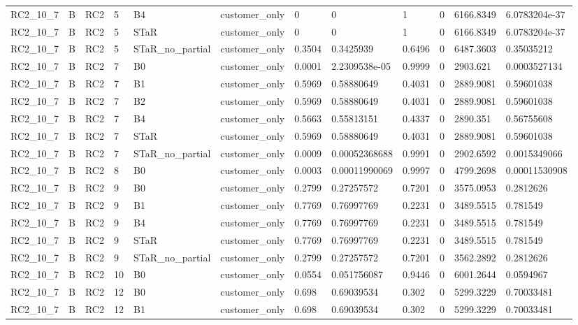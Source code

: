 \begin{longtable}{llllllllllll}
RC2\_10\_7 & B & RC2 & 5 & B4 & customer\_only & 0 & 0 & 1 & 0 & 6166.8349 & 6.0783204e-37 \\
RC2\_10\_7 & B & RC2 & 5 & STaR & customer\_only & 0 & 0 & 1 & 0 & 6166.8349 & 6.0783204e-37 \\
RC2\_10\_7 & B & RC2 & 5 & STaR\_no\_partial & customer\_only & 0.3504 & 0.3425939 & 0.6496 & 0 & 6487.3603 & 0.35035212 \\
RC2\_10\_7 & B & RC2 & 7 & B0 & customer\_only & 0.0001 & 2.2309538e-05 & 0.9999 & 0 & 2903.621 & 0.0003527134 \\
RC2\_10\_7 & B & RC2 & 7 & B1 & customer\_only & 0.5969 & 0.58880649 & 0.4031 & 0 & 2889.9081 & 0.59601038 \\
RC2\_10\_7 & B & RC2 & 7 & B2 & customer\_only & 0.5969 & 0.58880649 & 0.4031 & 0 & 2889.9081 & 0.59601038 \\
RC2\_10\_7 & B & RC2 & 7 & B4 & customer\_only & 0.5663 & 0.55813151 & 0.4337 & 0 & 2890.351 & 0.56755608 \\
RC2\_10\_7 & B & RC2 & 7 & STaR & customer\_only & 0.5969 & 0.58880649 & 0.4031 & 0 & 2889.9081 & 0.59601038 \\
RC2\_10\_7 & B & RC2 & 7 & STaR\_no\_partial & customer\_only & 0.0009 & 0.00052368688 & 0.9991 & 0 & 2902.6592 & 0.0015349066 \\
RC2\_10\_7 & B & RC2 & 8 & B0 & customer\_only & 0.0003 & 0.00011990069 & 0.9997 & 0 & 4799.2698 & 0.00011530908 \\
RC2\_10\_7 & B & RC2 & 9 & B0 & customer\_only & 0.2799 & 0.27257572 & 0.7201 & 0 & 3575.0953 & 0.2812626 \\
RC2\_10\_7 & B & RC2 & 9 & B1 & customer\_only & 0.7769 & 0.76997769 & 0.2231 & 0 & 3489.5515 & 0.781549 \\
RC2\_10\_7 & B & RC2 & 9 & B4 & customer\_only & 0.7769 & 0.76997769 & 0.2231 & 0 & 3489.5515 & 0.781549 \\
RC2\_10\_7 & B & RC2 & 9 & STaR & customer\_only & 0.7769 & 0.76997769 & 0.2231 & 0 & 3489.5515 & 0.781549 \\
RC2\_10\_7 & B & RC2 & 9 & STaR\_no\_partial & customer\_only & 0.2799 & 0.27257572 & 0.7201 & 0 & 3562.2892 & 0.2812626 \\
RC2\_10\_7 & B & RC2 & 10 & B0 & customer\_only & 0.0554 & 0.051756087 & 0.9446 & 0 & 6001.2644 & 0.0594967 \\
RC2\_10\_7 & B & RC2 & 12 & B0 & customer\_only & 0.698 & 0.69039534 & 0.302 & 0 & 5299.3229 & 0.70033481 \\
RC2\_10\_7 & B & RC2 & 12 & B1 & customer\_only & 0.698 & 0.69039534 & 0.302 & 0 & 5299.3229 & 0.70033481 \\

\end{longtable}
